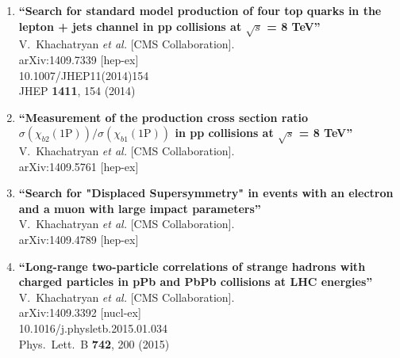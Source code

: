 \documentclass{article}
\begin{document}
\begin{enumerate}


\item%
{\bf ``Search for standard model production of four top quarks in the lepton + jets channel in pp collisions at $\sqrt{s}$ = 8 TeV''}
  \\{}V.~Khachatryan {\it et al.}  [CMS Collaboration].
  \\{}arXiv:1409.7339 [hep-ex]
    \\{}10.1007/JHEP11(2014)154
\\{}JHEP {\bf 1411}, 154 (2014) %


\item%
{\bf ``Measurement of the production cross section ratio $\sigma(\chi_{b2}(1\mathrm{P}))/ \sigma(\chi_{b1}(1\mathrm{P}))$ in pp collisions at $\sqrt{s}$ = 8 TeV''}
  \\{}V.~Khachatryan {\it et al.}  [CMS Collaboration].
  \\{}arXiv:1409.5761 [hep-ex]
  


\item%
{\bf ``Search for "Displaced Supersymmetry" in events with an electron and a muon with large impact parameters''}
  \\{}V.~Khachatryan {\it et al.}  [CMS Collaboration].
  \\{}arXiv:1409.4789 [hep-ex]
  


\item%
{\bf ``Long-range two-particle correlations of strange hadrons with charged particles in pPb and PbPb collisions at LHC energies''}
  \\{}V.~Khachatryan {\it et al.}  [CMS Collaboration].
  \\{}arXiv:1409.3392 [nucl-ex]
    \\{}10.1016/j.physletb.2015.01.034
\\{}Phys.\ Lett.\ B {\bf 742}, 200 (2015) %



\end{enumerate}
\end{document}
